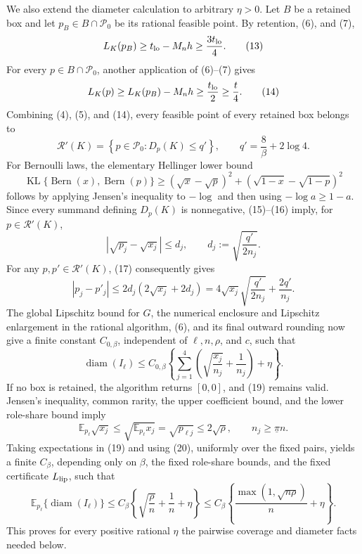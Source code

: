 We also extend the diameter calculation to arbitrary \(\eta>0\).  Let \(B\) be a retained box and let \(p_B\in B\cap\mathcal P_0\) be its rational feasible point.  By retention, (6), and (7),
\[
L_K(p_B)\geq t_{\rm lo}-M_nh\geq\frac{3t_{\rm lo}}4.
\tag{13}
\]
For every \(p\in B\cap\mathcal P_0\), another application of (6)--(7) gives
\[
L_K(p)\geq L_K(p_B)-M_nh
\geq\frac{t_{\rm lo}}2
\geq\frac t4.
\tag{14}
\]
Combining (4), (5), and (14), every feasible point of every retained box belongs to
\[
\mathcal R'(K)
=\left\{p\in\mathcal P_0:D_p(K)\leq q'\right\},
\qquad
q'=\frac8\beta+2\log4.
\tag{15}
\]
For Bernoulli laws, the elementary Hellinger lower bound
\[
\operatorname{KL}\{\operatorname{Bern}(x),\operatorname{Bern}(p)\}
\geq(\sqrt{x}-\sqrt{p})^2
+(\sqrt{1-x}-\sqrt{1-p})^2
\tag{16}
\]
follows by applying Jensen's inequality to \(-\log\) and then using \(-\log a\geq1-a\).  Since every summand defining \(D_p(K)\) is nonnegative, (15)--(16) imply, for \(p\in\mathcal R'(K)\),
\[
|\sqrt{p_j}-\sqrt{x_j}|
\leq d_j,
\qquad
d_j:=\sqrt{\frac{q'}{2n_j}}.
\tag{17}
\]
For any \(p,p'\in\mathcal R'(K)\), (17) consequently gives
\[
|p_j-p'_j|
\leq2d_j(2\sqrt{x_j}+2d_j)
=4\sqrt{x_j}\sqrt{\frac{q'}{2n_j}}+\frac{2q'}{n_j}.
\tag{18}
\]
The global Lipschitz bound for \(G\), the numerical enclosure and Lipschitz enlargement in the rational algorithm, (6), and its final outward rounding now give a finite constant \(C_{0,\beta}\), independent of \(\ell,n,\rho\), and \(c\), such that
\[
\operatorname{diam}(I_\ell)
\leq C_{0,\beta}
\left\{
\sum_{j=1}^4\left(\sqrt{\frac{x_j}{n_j}}+\frac1{n_j}\right)+\eta
\right\}.
\tag{19}
\]
If no box is retained, the algorithm returns \([0,0]\), and (19) remains valid.  Jensen's inequality, common rarity, the upper coefficient bound, and the lower role-share bound imply
\[
\mathbb E_{p_\ell}\sqrt{x_j}
\leq\sqrt{\mathbb E_{p_\ell}x_j}
=\sqrt{p_{\ell j}}
\leq2\sqrt\rho,
\qquad
n_j\geq\underline\pi n.
\tag{20}
\]
Taking expectations in (19) and using (20), uniformly over the fixed pairs, yields a finite \(C_\beta\), depending only on \(\beta\), the fixed role-share bounds, and the fixed certificate \(L_{\rm lip}\), such that
\[
\mathbb E_{p_\ell}\{\operatorname{diam}(I_\ell)\}
\leq C_\beta\left\{\sqrt{\frac\rho n}+\frac1n+\eta\right\}
\leq C_\beta\left\{\frac{\max(1,\sqrt{n\rho})}{n}+\eta\right\}.
\tag{21}
\]
This proves for every positive rational \(\eta\) the pairwise coverage and diameter facts needed below.

